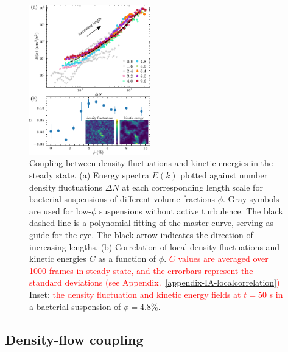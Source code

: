 \documentclass[twocolumn,aps,prx,amsmath,amssymb,longbibliography,superscriptaddress]{revtex4-2}
\begin{document}
\begin{figure}[t]
\begin{center}
\includegraphics[width=0.47\textwidth]{Figures/fig-5.pdf}
\caption[The correlation between GNF and kinetic energy and kinetic energy spectra.]
{
Coupling between density fluctuations and kinetic energies in the steady state.
(a) Energy spectra $E(k)$ plotted against number density fluctuations $\Delta N$ at each corresponding length scale for bacterial suspensions of different volume fractions $\phi$. Gray symbols are used for low-$\phi$ suspensions without active turbulence. The black dashed line is a polynomial fitting of the master curve, serving as guide for the eye. The black arrow indicates the direction of increasing lengths.
(b) Correlation of local density fluctuations and kinetic energies $C$ as a function of $\phi$. \textcolor{red}{$C$ values are averaged over 1000 frames in steady state, and the errorbars represent the standard deviations (see Appendix.~\ref{appendix-IA-localcorrelation})} Inset: \textcolor{red}{the density fluctuation and kinetic energy fields at $t=50$ s in} a bacterial suspension of $\phi = 4.8\%$.
}
\label{fig:GNF-energy-spectra-correlation}
\end{center}
\end{figure}

\subsection{Density-flow coupling} \label{Density-flow coupling}
\end{document}
